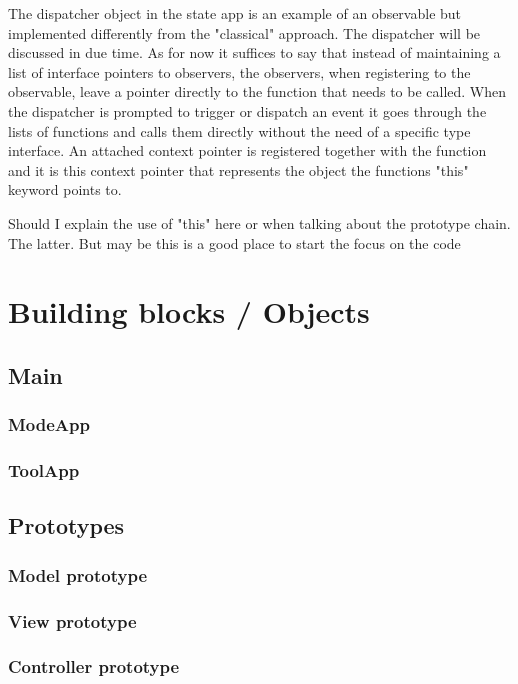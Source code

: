 \documentclass[english]{ifimaster}
\begin{document}
The dispatcher object in the state app is an example of an observable but implemented differently from the "classical" approach. The dispatcher will be discussed in due time. As for now it suffices to say that instead of maintaining a list of interface pointers to observers, the observers, when registering to the observable, leave a pointer directly to the function that needs to be called. When the dispatcher is prompted to trigger or dispatch an event it goes through the lists of functions and calls them directly without the need of a specific type interface. An attached context pointer is registered together with the function and it is this context pointer that represents the object the functions "this" keyword points to.

Should I explain the use of "this" here or when talking about the prototype chain. The latter. But may be this is a good place to start the focus on the code

\subsection{}
\section{Building blocks / Objects}
\subsection{Main}
\subsubsection{ModeApp}
\subsubsection{ToolApp}

\subsection{Prototypes}
\subsubsection{Model prototype}
\subsubsection{View prototype}
\subsubsection{Controller prototype}
\end{document}

